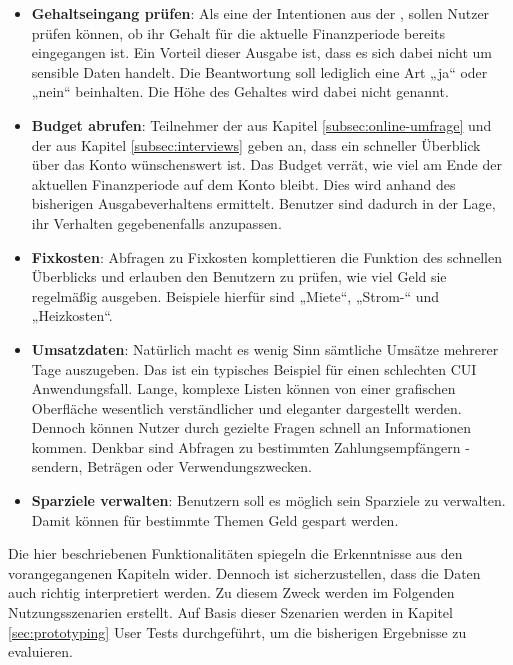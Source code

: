 \begin{itemize}
    \item\textbf{Gehaltseingang prüfen}: Als eine der Intentionen aus der , sollen Nutzer prüfen können, ob ihr Gehalt für die aktuelle Finanzperiode bereits eingegangen ist. Ein Vorteil dieser Ausgabe ist, dass es sich dabei nicht um sensible Daten handelt. Die Beantwortung soll lediglich eine Art „ja“ oder „nein“ beinhalten. Die Höhe des Gehaltes wird dabei nicht genannt. 
    
    \item\textbf{Budget abrufen}: Teilnehmer der  aus Kapitel \ref{subsec:online-umfrage} und der  aus Kapitel \ref{subsec:interviews} geben an, dass ein schneller Überblick über das Konto wünschenswert ist. Das Budget verrät, wie viel am Ende der aktuellen Finanzperiode auf dem Konto bleibt. Dies wird anhand des bisherigen Ausgabeverhaltens ermittelt. Benutzer sind dadurch in der Lage, ihr Verhalten gegebenenfalls anzupassen.
    
    \item\textbf{Fixkosten}: Abfragen zu Fixkosten komplettieren die Funktion des schnellen Überblicks und erlauben den Benutzern zu prüfen, wie viel Geld sie regelmäßig ausgeben. Beispiele hierfür sind „Miete“, „Strom-“ und „Heizkosten“.
    
    \item\textbf{Umsatzdaten}: Natürlich macht es wenig Sinn sämtliche Umsätze mehrerer Tage auszugeben. Das ist ein typisches Beispiel für einen schlechten \ac{CUI} Anwendungsfall. Lange, komplexe Listen können von einer grafischen Oberfläche wesentlich verständlicher und eleganter dargestellt werden. Dennoch können Nutzer durch gezielte Fragen schnell an Informationen kommen. Denkbar sind Abfragen zu bestimmten Zahlungsempfängern \bzw -sendern, Beträgen oder Verwendungszwecken. 
    
    \item\textbf{Sparziele verwalten}: Benutzern soll es möglich sein Sparziele zu verwalten. Damit können für bestimmte Themen Geld gespart werden.
\end{itemize}

Die hier beschriebenen Funktionalitäten spiegeln die Erkenntnisse aus den vorangegangenen Kapiteln wider. Dennoch ist sicherzustellen, dass die Daten auch richtig interpretiert werden. Zu diesem Zweck werden im Folgenden Nutzungsszenarien erstellt. Auf Basis dieser Szenarien werden in Kapitel \ref{sec:prototyping} User Tests durchgeführt, um die bisherigen Ergebnisse zu evaluieren.

